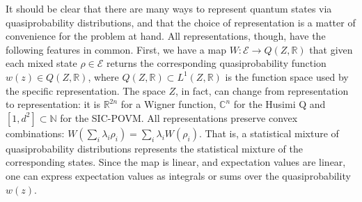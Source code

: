 \documentclass[10pt,twocolumn, nofootinbib]{revtex4-2}
\newcommand{\Ens}[1][E] {\mathcal{#1}} %
\begin{document}
It should be clear that there are many ways to represent quantum states via quasiprobability distributions, and that the choice of representation is a matter of convenience for the problem at hand. All representations, though, have the following features in common. First, we have a map $W : \Ens \to Q(Z,\mathbb{R})$ that given each mixed state $\rho \in \Ens$ returns the corresponding quasiprobability function $w(z) \in Q(Z,\mathbb{R})$, where $Q(Z,\mathbb{R}) \subset L^1(Z,\mathbb{R})$ is the function space used by the specific representation. The space $Z$, in fact, can change from representation to representation: it is $\mathbb{R}^{2n}$ for a Wigner function, $\mathbb{C}^n$ for the Husimi Q and $[1, d^2] \subset \mathbb{N}$ for the SIC-POVM. All representations preserve convex combinations: $W(\sum_i \lambda_i \rho_i) = \sum_i \lambda_i W(\rho_i)$. That is, a statistical mixture of quasiprobability distributions represents the statistical mixture of the corresponding states. Since the map is linear, and expectation values are linear, one can express expectation values as integrals or sums over the quasiprobability $w(z)$. 
\end{document}
